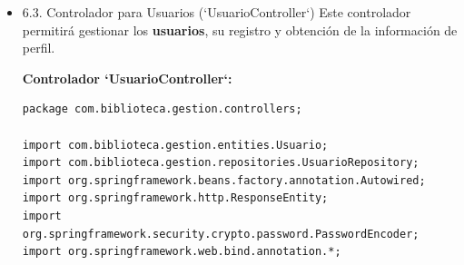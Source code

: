 \documentclass[11pt]{article}
\begin{document}
\begin{itemize}
\begin{verbatim}
    @Autowired
    private AutorRepository autorRepository;

    // Listar todos los autores
    @GetMapping
    public List<Autor> listarAutores() {
        return autorRepository.findAll();
    }

    // Crear un nuevo autor
    @PostMapping
    public ResponseEntity<Autor> crearAutor(@RequestBody @Valid Autor autor) {
        return ResponseEntity.ok(autorRepository.save(autor));
    }

    // Actualizar un autor
    @PutMapping("/{id}")
    public ResponseEntity<Autor> actualizarAutor(@PathVariable Long id, @RequestBody Autor autorActualizado) {
        return autorRepository.findById(id)
                .map(autor -> {
                    autor.setNombre(autorActualizado.getNombre());
                    autor.setNacionalidad(autorActualizado.getNacionalidad());
                    return ResponseEntity.ok(autorRepository.save(autor));
                })
                .orElse(ResponseEntity.notFound().build());
    }

    // Eliminar un autor
    @DeleteMapping("/{id}")
    public ResponseEntity<Void> eliminarAutor(@PathVariable Long id) {
        return autorRepository.findById(id)
                .map(autor -> {
                    autorRepository.delete(autor);
                    return ResponseEntity.noContent().build();
                })
                .orElse(ResponseEntity.notFound().build());
    }
}
\end{verbatim}


¡Perfecto! Ahora que ya tenemos los controladores de \textbf{\textbf{Libros}} y \textbf{\textbf{Autores}}, vamos a continuar con los controladores para \textbf{\textbf{Usuarios}} y \textbf{\textbf{Préstamos}}, siguiendo una estructura similar. Explicaré cada uno de estos controladores y sus endpoints.

\item 6.3. Controlador para Usuarios (`UsuarioController`)
\label{sec:org71ba784}
Este controlador permitirá gestionar los \textbf{\textbf{usuarios}}, su registro y obtención de la información de perfil.

\textbf{Controlador `UsuarioController`:}
\begin{verbatim}
package com.biblioteca.gestion.controllers;

import com.biblioteca.gestion.entities.Usuario;
import com.biblioteca.gestion.repositories.UsuarioRepository;
import org.springframework.beans.factory.annotation.Autowired;
import org.springframework.http.ResponseEntity;
import org.springframework.security.crypto.password.PasswordEncoder;
import org.springframework.web.bind.annotation.*;


\end{verbatim}
\end{itemize}
\end{document}
